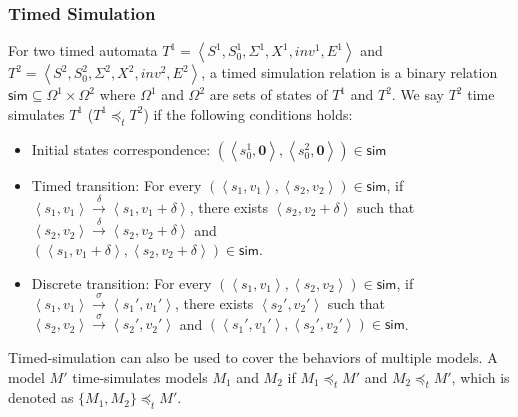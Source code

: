 \subsubsection{Timed Simulation}
For two timed automata $T^1=\left\langle S^1,S_0^1,\Sigma^1,X^1,inv^1,E^1\right\rangle$ and $T^2=\left\langle S^2,S_0^2,\Sigma^2,X^2,inv^2,E^2\right\rangle$, a timed simulation relation is a binary relation $\textsf{sim}\subseteq \Omega^1\times \Omega^2$ where $\Omega^1$ and $\Omega^2$ are sets of states of $T^1$ and $T^2$. We say $T^2$ \textsf{time simulates} $T^1$ ($T^1 \preceq_t T^2$) if the following conditions holds:
\begin{itemize}
	\item Initial states correspondence: $(\left\langle s_0^1,\textbf{0}\right\rangle,\left\langle s_0^2,\textbf{0}\right\rangle)\in \textsf{sim}$
	\item Timed transition: For every $(\left\langle s_1,v_1\right\rangle,\left\langle s_2,v_2\right\rangle)\in\textsf{sim}$, if $\left\langle s_1,v_1\right\rangle\xrightarrow{\delta}\left\langle s_1,v_1+\delta\right\rangle$, there exists $\left\langle s_2,v_2+\delta\right\rangle$ such that $\left\langle s_2,v_2\right\rangle\xrightarrow{\delta}\left\langle s_2,v_2+\delta\right\rangle$ and \\$(\left\langle s_1,v_1+\delta\right\rangle,\left\langle s_2,v_2+\delta\right\rangle)\in\textsf{sim}$.
	\item Discrete transition: For every $(\left\langle s_1,v_1\right\rangle,\left\langle s_2,v_2\right\rangle)\in\textsf{sim}$, if $\left\langle s_1,v_1\right\rangle\xrightarrow{\sigma}\left\langle s_1',v_1'\right\rangle$, there exists $\left\langle s_2',v_2'\right\rangle$ such that $\left\langle s_2,v_2\right\rangle\xrightarrow{\sigma}\left\langle s_2',v_2'\right\rangle$ and $(\left\langle s_1',v_1'\right\rangle,\left\langle s_2',v_2'\right\rangle)\in\textsf{sim}$.
\end{itemize}
Timed-simulation can also be used to cover the behaviors of multiple models. 
A model $M'$ time-simulates models $M_1$ and $M_2$ if $M_1\preceq_t M'$ and $M_2\preceq_t M'$,
which is denoted as $\{M_1,M_2\}\preceq_t M'$.




